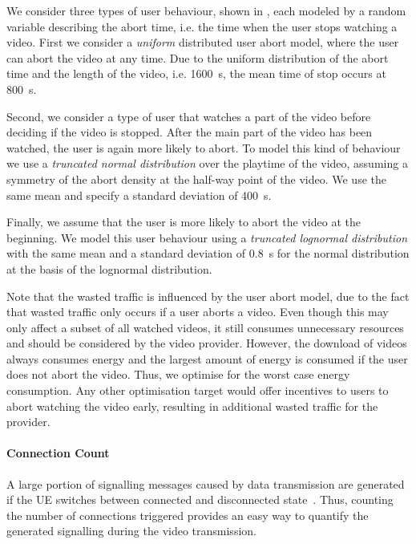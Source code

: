 We consider three types of user behaviour, shown in , each modeled by a random variable describing the abort time, i.e. the time when the user stops watching a video.
First we consider a \emph{uniform} distributed user abort model, where the user can abort the video at any time.
Due to the uniform distribution of the abort time and the length of the video, i.e. \SI{1600}{\second}, the mean time of stop occurs at \SI{800}{\second}.

Second, we consider a type of user that watches a part of the video before deciding if the video is stopped. 
After the main part of the video has been watched, the user is again more likely to abort.
To model this kind of behaviour we use a \emph{truncated normal distribution} over the playtime of the video, assuming a symmetry of the abort density at the half-way point of the video.
We use the same mean and specify a standard deviation of \SI{400}{\second}.

Finally, we assume that the user is more likely to abort the video at the beginning.
We model this user behaviour using a \emph{truncated lognormal distribution} with the same mean and a standard deviation of \SI{0.8}{\second} for the normal distribution at the basis of the lognormal distribution.

Note that the wasted traffic \meanwastedtraffic is influenced by the user abort model, due to the fact that wasted traffic only occurs if a user aborts a video.
Even though this may only affect a subset of all watched videos, it still consumes unnecessary resources and should be considered by the video provider.
However, the download of videos always consumes energy and the largest amount of energy is consumed if the user does not abort the video.
Thus, we optimise for the worst case energy consumption.
Any other optimisation target would offer incentives to users to abort watching the video early, resulting in additional wasted traffic for the provider.

\paragraph*{Connection Count}
A large portion of signalling messages caused by data transmission are generated if the \gls{UE} switches between connected and disconnected state~\cite{3GPP_RRC_Spec}.
Thus, counting the number of connections \connectioncount triggered provides an easy way to quantify the generated signalling during the video transmission.

